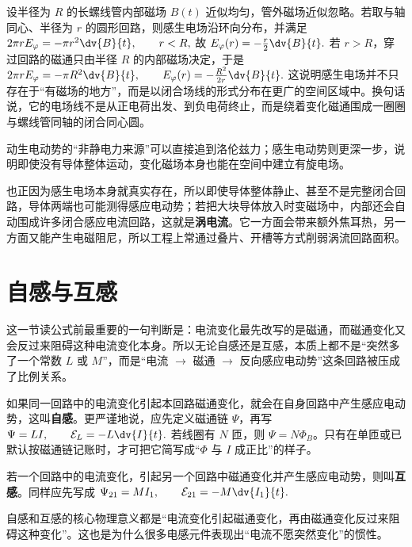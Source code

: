 \documentclass[lang=cn,11pt]{elegantbook}
\begin{document}
\begin{exercise}
设半径为 \(R\) 的长螺线管内部磁场 \(B(t)\) 近似均匀，管外磁场近似忽略。若取与轴同心、半径为 \(r\) 的圆形回路，则感生电场沿环向分布，并满足
 \(2\pi r E_\varphi=-\pi r^2\dv{B}{t}, \qquad r<R,\) 
故
 \(E_\varphi(r)=-\frac{r}{2}\dv{B}{t}.\) 
若 \(r>R\)，穿过回路的磁通只由半径 \(R\) 的内部磁场决定，于是
 \(2\pi r E_\varphi=-\pi R^2\dv{B}{t}, \qquad E_\varphi(r)=-\frac{R^2}{2r}\dv{B}{t}.\) 
这说明感生电场并不只存在于“有磁场的地方”，而是以闭合场线的形式分布在更广的空间区域中。换句话说，它的电场线不是从正电荷出发、到负电荷终止，而是绕着变化磁通围成一圈圈与螺线管同轴的闭合同心圆。
\end{exercise}

\begin{remark}
动生电动势的“非静电力来源”可以直接追到洛伦兹力；感生电动势则更深一步，说明即使没有导体整体运动，变化磁场本身也能在空间中建立有旋电场。
\end{remark}

\begin{remark}
也正因为感生电场本身就真实存在，所以即使导体整体静止、甚至不是完整闭合回路，导体两端也可能测得感应电动势；若把大块导体放入时变磁场中，内部还会自动围成许多闭合感应电流回路，这就是\textbf{涡电流}。它一方面会带来额外焦耳热，另一方面又能产生电磁阻尼，所以工程上常通过叠片、开槽等方式削弱涡流回路面积。
\end{remark}

\section{自感与互感}

这一节读公式前最重要的一句判断是：电流变化最先改写的是磁通，而磁通变化又会反过来阻碍这种电流变化本身。所以无论自感还是互感，本质上都不是“突然多了一个常数 \(L\) 或 \(M\)”，而是“电流 \(\rightarrow\) 磁通 \(\rightarrow\) 反向感应电动势”这条回路被压成了比例关系。

如果同一回路中的电流变化引起本回路磁通变化，就会在自身回路中产生感应电动势，这叫\textbf{自感}。更严谨地说，应先定义磁通链 \(\Psi\)，再写
 \(\Psi=LI, \qquad \mathcal{E}_L=-L\dv{I}{t}.\) 
若线圈有 \(N\) 匝，则 \(\Psi=N\Phi_B\)。只有在单匝或已默认按磁通链记账时，才可把它简写成“\(\Phi\) 与 \(I\) 成正比”的样子。

若一个回路中的电流变化，引起另一个回路中磁通变化并产生感应电动势，则叫\textbf{互感}。同样应先写成
 \(\Psi_{21}=MI_1, \qquad \mathcal{E}_{21}=-M\dv{I_1}{t}.\) 

\begin{note}
自感和互感的核心物理意义都是“电流变化引起磁通变化，再由磁通变化反过来阻碍这种变化”。这也是为什么很多电感元件表现出“电流不愿突然变化”的惯性。
\end{note}
\end{document}

